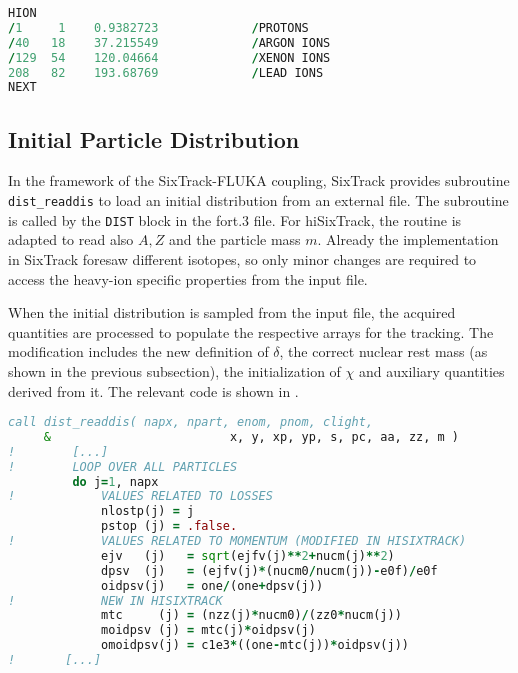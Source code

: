 \begin{appendices}
\vspace{0.5cm}
\begin{minipage}{\linewidth}
\begin{lstlisting}[language=Fortran,caption={New heavy-ion block in the fort.3 file to activate hiSixTrack. In the given example, the chosen reference ion species is \lead. Lines starting with '/' are commented out.}, label={lst:f3hi}]
HION
/1     1    0.9382723             /PROTONS
/40   18    37.215549             /ARGON IONS
/129  54    120.04664             /XENON IONS
208   82    193.68769             /LEAD IONS
NEXT
\end{lstlisting}
\end{minipage}

\subsection{Initial Particle Distribution}

In the framework of the SixTrack-FLUKA coupling, SixTrack provides subroutine \lstinline{dist_readdis} to load an initial distribution from an external file. The subroutine is called by the \lstinline{DIST} block in the fort.3 file. For hiSixTrack, the routine is adapted to read also $A,Z$ and the particle mass $m$. Already the implementation in SixTrack foresaw different isotopes, so only minor changes are required to access the heavy-ion specific properties from the input file.

When the initial distribution is sampled from the input file, the acquired quantities are processed to populate the respective arrays for the tracking. The modification includes the new definition of $\delta$, the correct nuclear rest mass (as shown in the previous subsection), the initialization of $\chi$ and auxiliary quantities derived from it. The relevant code is shown in .


\vspace{0.5cm}
\begin{minipage}{\linewidth}
\begin{lstlisting}[language=Fortran,caption=Definition of the subroutine \lstinline{dist_readdis} in hiSixTrack including the initialization of $\chi$ and auxiliary quantities as well as the redefined $\delta$.,label=lst_dist_readdis]
         call dist_readdis( napx, npart, enom, pnom, clight,
     &                         x, y, xp, yp, s, pc, aa, zz, m )
!        [...]         
!        LOOP OVER ALL PARTICLES
         do j=1, napx
!            VALUES RELATED TO LOSSES
             nlostp(j) = j
             pstop (j) = .false.
!            VALUES RELATED TO MOMENTUM (MODIFIED IN HISIXTRACK)
             ejv   (j)   = sqrt(ejfv(j)**2+nucm(j)**2)	             
             dpsv  (j)   = (ejfv(j)*(nucm0/nucm(j))-e0f)/e0f
             oidpsv(j)   = one/(one+dpsv(j))
!            NEW IN HISIXTRACK
             mtc     (j) = (nzz(j)*nucm0)/(zz0*nucm(j))  
             moidpsv (j) = mtc(j)*oidpsv(j)
             omoidpsv(j) = c1e3*((one-mtc(j))*oidpsv(j))
!       [...]
\end{lstlisting}
\end{minipage}





\end{appendices}
